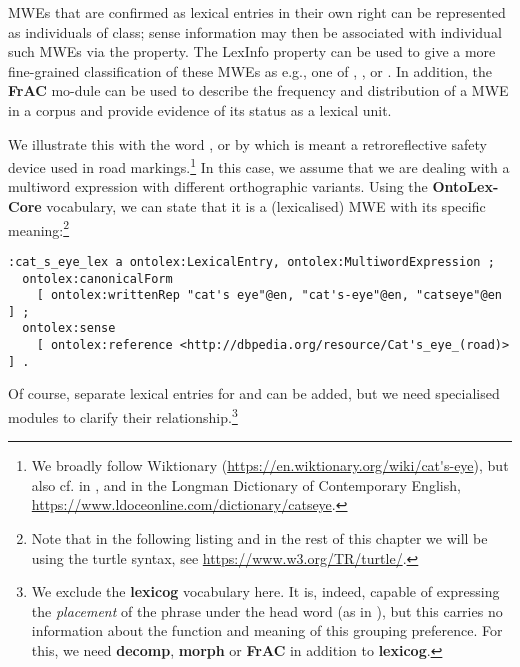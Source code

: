 \documentclass[output=paper,colorlinks,citecolor=brown]{langscibook}
\begin{document}
MWEs that are
confirmed as %
lexical entries in their own right
can be represented as individuals of  class; sense information may then be associated with individual such MWEs via the  property. The LexInfo property 
can be used to give a more fine-grained classification of these MWEs as e.g., one of , ,
     or .
In addition, the \textbf{FrAC} mo-dule can be used to describe the frequency and distribution of a MWE in a corpus and provide evidence of its status as a lexical unit.

We illustrate this with the word ,  or  by which is meant a retroreflective safety device used in road markings.\footnote{We broadly follow Wiktionary (\url{https://en.wiktionary.org/wiki/cat's-eye}), but also cf.  in \citet{brewer1991brewer}, and  in the Longman Dictionary of Contemporary English, \url{https://www.ldoceonline.com/dictionary/catseye}.}
In this case, we assume that we are dealing with a multiword expression with different orthographic variants.
Using the \textbf{OntoLex-Core} vocabulary, we can state that it is a (lexicalised) MWE with its specific meaning:\footnote{Note that in the following listing and in the rest of this chapter we will be using the turtle syntax, see \url{https://www.w3.org/TR/turtle/}. }

{\listingsize
\begin{verbatim}
:cat_s_eye_lex a ontolex:LexicalEntry, ontolex:MultiwordExpression ;
  ontolex:canonicalForm
    [ ontolex:writtenRep "cat's eye"@en, "cat's-eye"@en, "catseye"@en ] ;
  ontolex:sense
    [ ontolex:reference <http://dbpedia.org/resource/Cat's_eye_(road)> ] .
\end{verbatim}
}

\noindent Of course, separate lexical entries for  and  can be added, but we need specialised modules to clarify their relationship.\footnote{We exclude the \textbf{lexicog} vocabulary here. It is, indeed, capable of expressing the \emph{placement} of the phrase  under the head word  (as in \citealt[88]{brewer1991brewer}), but this carries no information about the function and meaning of this grouping preference. For this, we need \textbf{decomp}, \textbf{morph} or \textbf{FrAC} in addition to \textbf{lexicog}.}
\end{document}
